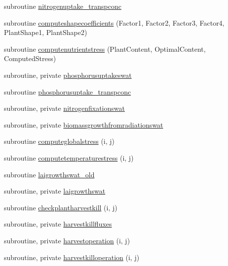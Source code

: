 \begin{DoxyCompactItemize}
\item 
subroutine \mbox{\hyperlink{namespacemodulevegetation_a1a53d3932ef020aaa3e0656050c15ee3}{nitrogenuptake\+\_\+transpconc}}
\item 
subroutine \mbox{\hyperlink{namespacemodulevegetation_a977606da8238f3bcf3eeedafa42a6582}{computeshapecoefficients}} (Factor1, Factor2, Factor3, Factor4, Plant\+Shape1, Plant\+Shape2)
\item 
subroutine \mbox{\hyperlink{namespacemodulevegetation_abdb0b0a9e6c19d706d25ff42b84611d2}{computenutrientstress}} (Plant\+Content, Optimal\+Content, Computed\+Stress)
\item 
subroutine, private \mbox{\hyperlink{namespacemodulevegetation_a4d0b983635068517bf0b541f0784430a}{phosphorusuptakeswat}}
\item 
subroutine \mbox{\hyperlink{namespacemodulevegetation_a00089a428473ea96d0f567289aabe4f8}{phosphorusuptake\+\_\+transpconc}}
\item 
subroutine, private \mbox{\hyperlink{namespacemodulevegetation_ac64ef166fcd5b553f404eca77d3f8ad4}{nitrogenfixationswat}}
\item 
subroutine, private \mbox{\hyperlink{namespacemodulevegetation_a156df3425609d782754520991389dc1a}{biomassgrowthfromradiationswat}}
\item 
subroutine \mbox{\hyperlink{namespacemodulevegetation_a9bed5257328690b46cde01cfe91f313a}{computeglobalstress}} (i, j)
\item 
subroutine \mbox{\hyperlink{namespacemodulevegetation_a0a72b8d43553476da7abbddd263b7c85}{computetemperaturestress}} (i, j)
\item 
subroutine \mbox{\hyperlink{namespacemodulevegetation_a0ec3ba9198a58232c38fd166c72810d5}{laigrowthswat\+\_\+old}}
\item 
subroutine, private \mbox{\hyperlink{namespacemodulevegetation_a86662f45554df67ceb2fd66d1ff3afd1}{laigrowthswat}}
\item 
subroutine \mbox{\hyperlink{namespacemodulevegetation_a3456662ceedeb9f7d5ad12c24dd83bc4}{checkplantharvestkill}} (i, j)
\item 
subroutine, private \mbox{\hyperlink{namespacemodulevegetation_a68c29b5f11f8bae818809241e638e11a}{harvestkillfluxes}}
\item 
subroutine, private \mbox{\hyperlink{namespacemodulevegetation_a3dc6ee6dd39f0f9ae9bbbe6356b45efc}{harvestoperation}} (i, j)
\item 
subroutine, private \mbox{\hyperlink{namespacemodulevegetation_a5b6084c4fb89b8ce3f29e23d6b623bef}{harvestkilloperation}} (i, j)

\end{DoxyCompactItemize}
